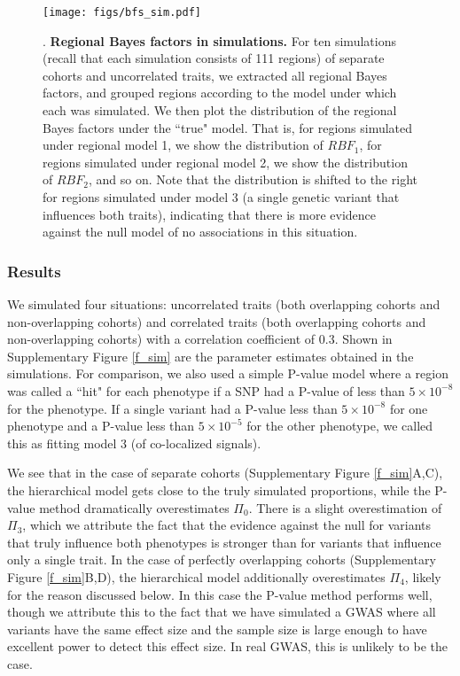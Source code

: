\documentclass[11pt,titlepage]{article}
\begin{document}
\begin{figure}
\begin{center}
\texttt{[image: figs/bfs\_sim.pdf]}
\caption{. \textbf{Regional Bayes factors in simulations.} For ten simulations (recall that each simulation consists of 111 regions) of separate cohorts and uncorrelated traits, we extracted all regional Bayes factors, and grouped regions according to the model under which each was simulated. We then plot the distribution of the regional Bayes factors under the ``true" model. That is, for regions simulated under regional model 1, we show the distribution of $RBF_1$, for regions simulated under regional model 2, we show the distribution of $RBF_2$, and so on. Note that the distribution is shifted to the right for regions simulated under model 3 (a single genetic variant that influences both traits), indicating that there is more evidence against the null model of no associations in this situation.}\label{f_bfsim}
\end{center}
\end{figure}


\subsubsection{Results}
We simulated four situations: uncorrelated traits (both overlapping cohorts and non-overlapping cohorts) and correlated traits (both overlapping cohorts and non-overlapping cohorts) with a correlation coefficient of 0.3. Shown in Supplementary Figure \ref{f_sim} are the parameter estimates obtained in the simulations. For comparison, we also used a simple P-value model where a region was called a ``hit" for each phenotype if a SNP had a P-value of less than $5\times 10^{-8}$ for the phenotype. If a single variant had a P-value less than $5\times10^{-8}$ for one phenotype and a P-value less than $5\times10^{-5}$ for the other phenotype, we called this as fitting model 3 (of co-localized signals). 

We see that in the case of separate cohorts (Supplementary Figure \ref{f_sim}A,C), the hierarchical model gets close to the truly simulated proportions, while the P-value method dramatically overestimates $\Pi_0$. There is a slight overestimation of $\Pi_3$, which we attribute the fact that the evidence against the null for variants that truly influence both phenotypes is stronger than for variants that influence only a single trait. In the case of perfectly overlapping cohorts (Supplementary Figure \ref{f_sim}B,D), the hierarchical model additionally overestimates $\Pi_4$, likely for the reason discussed below. In this case the P-value method performs well, though we attribute this to the fact that we have simulated a GWAS where all variants have the same effect size and the sample size is large enough to have excellent power to detect this effect size. In real GWAS, this is unlikely to be the case.
\end{document}
